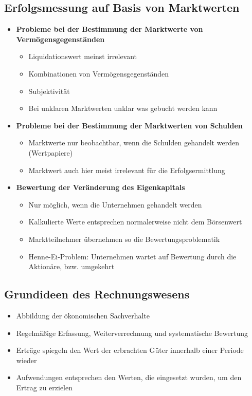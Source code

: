 \subsection{Erfolgsmessung auf Basis von Marktwerten}
\begin{itemize}
	\item \textbf{Probleme bei der Bestimmung der Marktwerte von Vermögensgegenständen}
	\begin{itemize}
		\item Liquidationswert meinst irrelevant
		\item Kombinationen von Vermögensgegenständen
		\item Subjektivität
		\item Bei unklaren Marktwerten unklar was gebucht werden kann
	\end{itemize}
	\item \textbf{Probleme bei der Bestimmung der Marktwerten von Schulden}
	\begin{itemize}
		\item Marktwerte nur beobachtbar, wenn die Schulden gehandelt werden (Wertpapiere)
		\item Marktwert auch hier meist irrelevant für die Erfolgsermittlung
	\end{itemize}
	\item \textbf{Bewertung der Veränderung des Eigenkapitals}
	\begin{itemize}
		\item Nur möglich, wenn die Unternehmen gehandelt werden
		\item Kalkulierte Werte entsprechen normalerweise nicht dem Börsenwert
		\item Marktteilnehmer übernehmen so die Bewertungsproblematik
		\item Henne-Ei-Problem: Unternehmen wartet auf Bewertung durch die Aktionäre, bzw. umgekehrt
	\end{itemize}
\end{itemize}


\subsection{Grundideen des Rechnungswesens}
\begin{itemize}
	\item Abbildung der ökonomischen Sachverhalte
	\item Regelmäßige Erfassung, Weiterverrechnung und systematische Bewertung
	\item Erträge spiegeln den Wert der erbrachten Güter innerhalb einer Periode wieder
	\item Aufwendungen entsprechen den Werten, die eingesetzt wurden, um den Ertrag zu erzielen
\end{itemize}


